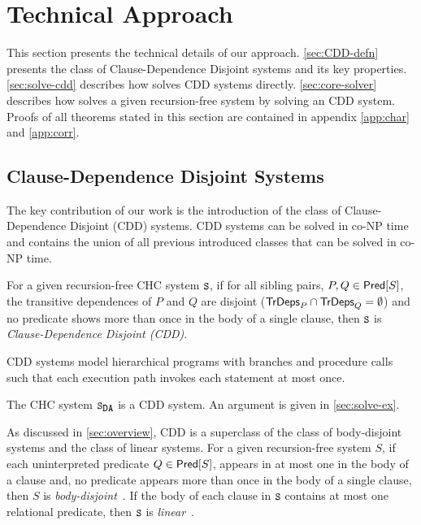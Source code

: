 \section{Technical Approach}
\label{sec:approach}
%
This section presents the technical details of our approach.
%
\autoref{sec:CDD-defn} presents the class of Clause-Dependence Disjoint
systems and its key properties.
%
\autoref{sec:solve-cdd} describes how \sys solves CDD systems
directly.
%
\autoref{sec:core-solver} describes how \sys solves a given
recursion-free system by solving an CDD system.
%
Proofs of all theorems stated in this section are contained in appendix
\autoref{app:char} and \autoref{app:corr}.

\subsection{Clause-Dependence Disjoint Systems}
\label{sec:CDD-defn}
%
The key contribution of our work is the introduction of the class of
Clause-Dependence Disjoint (CDD) systems.
%
CDD systems can be solved
in co-NP time and contains the union of all previous introduced classes
that can be solved in co-NP time.
%
\begin{defn}
  \label{defn:cdds}
  For a given recursion-free CHC system $\cc{S}$,
  if for all sibling pairs, $P, Q \in \mathsf{Pred}[ S ]$,
  the transitive dependences of $P$ and $Q$ are disjoint ($\mathsf{TrDeps}_{P} \cap
  \mathsf{TrDeps}_{Q} = \emptyset$)
  and no predicate shows more than once in the body of a single clause,
  then $\cc{S}$ is \emph{Clause-Dependence Disjoint (CDD)}.
\end{defn}
%
CDD systems model hierarchical programs with branches and procedure calls such
that each execution path invokes each statement at most once.
%
\begin{ex}
  The CHC system $\mcchc$ is a CDD system. An argument is given in
  \autoref{sec:solve-ex}.
\end{ex}

As discussed in \autoref{sec:overview}, CDD is a superclass of the
class of body-disjoint systems and the class of linear systems.
%
For a given recursion-free system $S$, if each uninterpreted predicate $Q \in
\mathsf{Pred}[ S ]$, appears in at most one in the body of a clause and, no
predicate appears more than once in the body of a single clause,
then $S$ is \emph{body-disjoint}~\cite{rummer13a,rummer13b}.
%
If the body of each clause in $\cc{S}$ contains at most one relational
predicate, then $\cc{S}$ is \emph{linear}~\cite{albarghouthi12a}.

